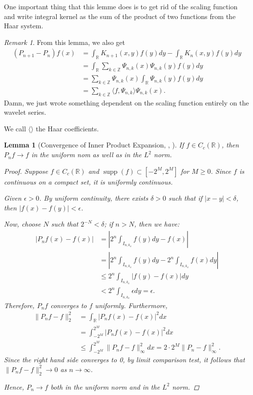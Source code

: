 \documentclass[11pt]{amsart}
\newcommand{\info}[1]{\todo[linecolor=OliveGreen,backgroundcolor=OliveGreen!25,bordercolor=OliveGreen]{#1}}
\theoremstyle{theorem} %
\newtheorem{lem}[thm]{Lemma} %
\theoremstyle{definition}
\theoremstyle{example}
\theoremstyle{remark}
\newtheorem{rem}[thm]{Remark}
\numberwithin{equation}{section}
\newcommand{\R}{\mathbb{R}}
\newcommand{\Z}{\mathbb{Z}}
\DeclareMathOperator*{\supp}{supp}
\begin{document}
One important thing that this lemme does is to get rid of the scaling function and write integral kernel as the sum of the product of two functions from the Haar system.

\begin{rem}
	From this lemma, we also get
	\begin{align*}
		(P_{n+1} - P_n) f(x) &= \int_{\R} K_{n+1}(x,y)f(y)dy - \int_{\R} K_{n}(x,y)f(y)dy \\
		&= \int_{\R} \sum_{k \in \Z} \varPsi_{n,k}(x) \varPsi_{n,k}(y) f(y) dy \\
		&= \sum_{k \in \Z} \varPsi_{n,k}(x) \int_{\R} \varPsi_{n,k}(y) f(y) dy \\
		&= \sum_{k \in \Z} \langle f, \varPsi_{n,k} \rangle \varPsi_{n,k}(x).
	\end{align*}
	Damn, we just wrote something dependent on the scaling function entirely on the wavelet series.
	
	We call $ \langle \rangle $ the Haar coefficients.
\end{rem}

\begin{lem}[Convergence of Inner Product Expansion, {\cite[7]{bell}, \cite[517]{davidson}}]
	If $ f \in C_c(\R) $, then $ P_nf \to f $ in the uniform nom as well as in the $ L^2 $ norm.
	
	\info{draw a picture of $ P_nf $}
	\begin{proof}
		Suppose $ f \in C_c(\R) $ and $ \supp(f) \subset [-2^M, 2^M] $ for $ M \geq 0 $. Since $ f $ is continuous on a compact set, it is uniformly continuous.
		
		Given $ \epsilon > 0 $. By uniform continuity, there exists $ \delta > 0 $ such that if $ |x-y| < \delta $, then $ |f(x) - f(y)| < \epsilon $.
		
		Now, choose $ N $ such that $ 2^{-N} < \delta $; if $ n > N $, then we have:
		\begin{align*}
			|P_nf(x) - f(x)| &= \left| 2^n \int_{I_{n,k_x}} f(y)dy - f(x) \right| \\
			&=  \left| 2^n \int_{I_{n,k_x}} f(y)dy - 2^n \int_{I_{n,k_x}} f(x) dy \right| \\
			&\leq 2^n \int_{I_{n,k_x}} |f(y) - f(x)| dy\\
			&< 2^n \int_{I_{n,k_x}} \epsilon dy = \epsilon.
		\end{align*}
		Therefore, $ P_nf $ converges to $ f $ uniformly. Furthermore,
		\begin{align*}
			\| P_nf - f \|_2^2 &= \int_{\R} |P_nf(x) - f(x)|^2dx \\
			&= \int_{-2^M}^{2^M} |P_nf(x) - f(x)|^2dx \\
			&\leq \int_{-2^M}^{2^M} \|P_nf - f\|_\infty^2dx = 2 \cdot 2^M \| P_n - f \|_\infty^2.
		\end{align*}
		Since the right hand side converges to 0, by limit comparison test, it follows that $ \| P_nf-f \|_2^2 \to 0 $ as $ n \to \infty $.
		
		Hence, $ P_n \to f $ both in the uniform norm and in the $ L^2 $ norm.
	\end{proof}
\end{lem}
\end{document}
